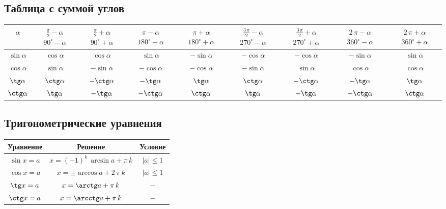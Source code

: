 \subsection{Таблица с суммой углов}

\begin{tabu}[t]{||c|c|c|c|c|c|c|c|c||}
	\hline
		$ \alpha $ &
			 &
			 &
			 &
			 &
			 &
			 &
			 &
			 \\
	\hline
		$ \sin \alpha $ & 	$ \cos \alpha $ & 	$ \cos \alpha $ & 	$ \sin \alpha $ & 	$ -\sin \alpha $ & 	$ -\cos \alpha $ & 	$ -\cos \alpha $ & 	$ -\sin \alpha $ & 	$ \sin \alpha $ \\
	\hline
		$ \cos \alpha $ & 	$ \sin \alpha $ & 	$ -\sin \alpha $ & 	$ -\cos \alpha $ & 	$ -\cos \alpha $ & 	$ -\sin \alpha $ & 	$ \sin \alpha $ & 	$ \cos \alpha $ & 	$ \cos \alpha $ \\
	\hline
		$ \tg \alpha $ & 	$ \ctg \alpha $ & 	$ -\ctg \alpha $ & 	$ -\tg \alpha $ & 	$ \tg \alpha $ & 	$ \ctg \alpha $ & 	$ -\ctg \alpha $ & 	$ -\tg \alpha $ & 	$ \tg \alpha $ \\
	\hline
		$ \ctg \alpha $ & 	$ \tg \alpha $ & 	$ -\tg \alpha $ & 	$ -\ctg \alpha $ & 	$ \ctg \alpha $ & 	$ \tg \alpha $ & 	$ -\tg \alpha $ & 	$ -\ctg \alpha $ & 	$ \ctg \alpha $ \\
	\hline
\end{tabu}

\subsection{Тригонометрические уравнения}

\begin{tabu}[t]{||c|c|c||}
	\hline
		Уравнение & Решение & Условие \\
	\hline
		$ \sin x = a $ & 	$ x = (-1)^k\, \arcsin a + \pi\, k $ & 	$ |a| \le 1 $ \\
	\hline
		$ \cos x = a $ & 	$ x = \pm \arccos a + 2\, \pi\, k $ & 	$ |a| \le 1 $ \\
	\hline
		$ \tg x = a $ & 	$ x = \arctg a + \pi\, k $ & 	$ - $ \\
	\hline
		$ \ctg x = a $ & 	$ x = \arcctg a + \pi\, k $ & 	$ - $ \\
	\hline
\end{tabu}

